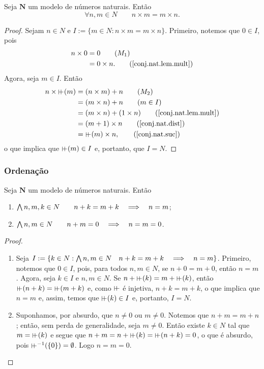 \begin{theorem}
	Seja $\bm N$ um modelo de números naturais. Então
	\begin{equation*}
	\forall n,m \in N \qquad n \times m = m \times n.
	\end{equation*}
\end{theorem}
\begin{proof}
	Sejam $n \in N$ e $I := \{m \in N:n \times m=m \times n\}$. Primeiro, notemos que $0 \in I$, pois
	\begin{align*}
	n \times 0 &= 0 													\tag{$M_1$} \\
		&= 0 \times n.													\tag{\ref{conj.nat.lem.mult}}
	\end{align*}
Agora, seja $m \in I$. Então
	\begin{align*}
	n \times \suce(m) &= (n \times m) + n							\tag{$M_2$} \\
		&= (m \times n) + n											\tag{$m \in I$} \\
		&= (m \times n) + (1 \times n)							\tag{\ref{conj.nat.lem.mult}} \\
		&= (m +1) \times n											\tag{\ref{conj.nat.dist}} \\
		&= \suce(m) \times n,												\tag{\ref{conj.nat.suc}}
	\end{align*}
o que implica que $\suce(m) \in I$ e, portanto, que $I=N$.
\end{proof}

\subsubsection{Ordenação}

\begin{lemma}
	Seja $\bm N$ um modelo de números naturais. Então
	\begin{enumerate}
	\item $\bigwedge\nolimits n,m,k \in N \qquad n+k=m+k \quad \Longrightarrow \quad n=m$;
	\item $\bigwedge\nolimits n,m \in N \qquad n+m = 0 \quad \Longrightarrow \quad n=m=0$.
	\end{enumerate}
\end{lemma}
\begin{proof}
	\begin{enumerate}
	\item Seja $I := \{k \in N: \bigwedge\nolimits n,m \in N \quad n+k=m+k \quad \Longrightarrow \quad n=m\}$. Primeiro, notemos que $0 \in I$, pois, para todos $n,m \in N$, se $n+0=m+0$, então $n=m$. Agora, seja $k \in I$ e $n,m \in N$. Se $n+\suce(k)=m+\suce(k)$, então $\suce(n+k)=\suce(m+k)$ e, como $\suce$ é injetiva, $n+k=m+k$, o que implica que $n=m$ e, assim, temos que $\suce(k) \in I$ e, portanto, $I=N$.
	
	\item Suponhamos, por absurdo, que $n \neq 0$ ou $m \neq 0$. Notemos que $n+m=m+n$; então, sem perda de generalidade, seja $m \neq 0$. Então existe $k \in N$ tal que $m=\suce(k)$ e segue que $n+m=n+\suce(k)=\suce(n+k)=0$, o que é absurdo, pois $\suce^{-1}(\{0\})=\emptyset$. Logo $n=m=0$.
	\end{enumerate}
\end{proof}

